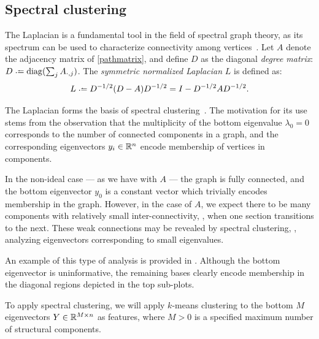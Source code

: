 \documentclass{article}
\begin{document}

\subsection{Spectral clustering}

The Laplacian is a fundamental tool in the field of spectral graph
theory, as its spectrum can be used to characterize 
connectivity among vertices~\cite{chung1997spectral}.  
Let $A$ denote the adjacency matrix of \cref{pathmatrix}, and define $D$ as the
diagonal \emph{degree matrix}: $D \defeq \diag(\sum_{j} A_{\cdot, j})$.  The
\emph{symmetric normalized Laplacian} $L$ is defined as:
\begin{equation}
L \defeq D^{-1/2} (D - A) D^{-1/2}= I - D^{-1/2} A D^{-1/2}.\label{rwlaplacian}
\end{equation}

The Laplacian forms the basis of spectral clustering~\cite{von2007tutorial}.  The
motivation for its use stems from the observation that the multiplicity of the bottom
eigenvalue $\lambda_0 = 0$ corresponds to the number of connected components in a
graph, and the corresponding eigenvectors $y_i \in \mathbb{R}^n$ encode membership of vertices
in components.

In the non-ideal case --- as we have with $A$ --- the graph is fully connected, and
the bottom eigenvector $y_0$ is a constant vector which trivially encodes membership 
in the graph.  However, in the case of $A$, we expect there to be many components
with relatively small inter-connectivity, \ie, when one section transitions to the
next.  These weak connections may be revealed by spectral clustering, \ie, analyzing 
eigenvectors corresponding to small eigenvalues.

An example of this type of analysis is provided in .  Although the
bottom eigenvector is uninformative, the remaining bases clearly encode membership in
the diagonal regions depicted in the top sub-plots.

To apply spectral clustering, we will apply $k$-means clustering to the bottom $M$ 
eigenvectors $Y \in \mathbb{R}^{M \times n}$ as features, where $M > 0$ is a specified maximum 
number of structural components.

\end{document}
